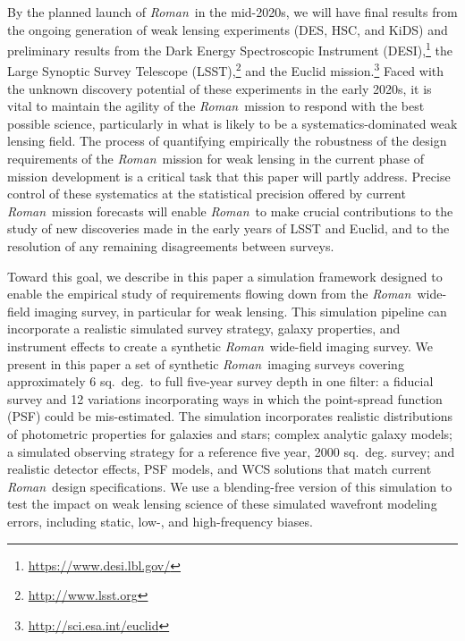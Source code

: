 \documentclass[usenatbib]{mnras}
\newcommand{\wfirst}{{\slshape Roman}}
\newcommand{\changetext}[1]{\textcolor{brown}{#1}}
\begin{document}
By the planned launch of \wfirst\ in the mid-2020s, we will have final results from the ongoing generation of weak lensing experiments (DES, HSC, and KiDS) and preliminary results from the Dark Energy Spectroscopic Instrument (DESI),\footnote{\url{https://www.desi.lbl.gov/}} the Large Synoptic Survey Telescope (LSST),\footnote{\url{http://www.lsst.org}} and the Euclid mission.\footnote{\url{http://sci.esa.int/euclid}} 
Faced with the unknown discovery potential of these experiments in the early 2020s, it is vital to maintain the agility of the \wfirst\ mission to respond with the best possible science, particularly in what is likely to be a systematics-dominated weak lensing field.
The process of quantifying empirically the robustness of the design requirements of the \wfirst\ mission for weak lensing in the current phase of mission development is a critical task that this paper will partly address. 
Precise control of these systematics at the statistical precision offered by current \wfirst\ mission forecasts \changetext{\citep{2020arXiv200404702E, 2020arXiv200405271E}} will enable \wfirst\ to make crucial contributions to the study of new discoveries made in the early years of LSST and Euclid, and to the resolution of any remaining disagreements between surveys.

Toward this goal, we describe in this paper a simulation framework designed to enable the empirical study of requirements flowing down from the \wfirst\ wide-field imaging survey, in particular for weak lensing. 
This simulation pipeline can incorporate a realistic simulated survey strategy, galaxy properties, and instrument effects to create a synthetic \wfirst\ wide-field imaging survey. 
We present in this paper a set of synthetic \wfirst\ imaging surveys covering approximately 6 sq.~deg.~to full five-year survey depth in one filter: a fiducial survey and 12 variations incorporating ways in which the point-spread function (PSF) could be mis-estimated. 
The simulation incorporates realistic distributions of photometric properties for galaxies and stars; complex analytic galaxy models; a simulated observing strategy for a reference five year, 2000 sq.~deg. survey; and realistic detector effects, PSF models, and WCS solutions that match current \wfirst\ design specifications. 
We use a blending-free version of this simulation to test the impact on weak lensing science of these simulated wavefront modeling errors, including static, low-, and high-frequency biases. 
\end{document}
